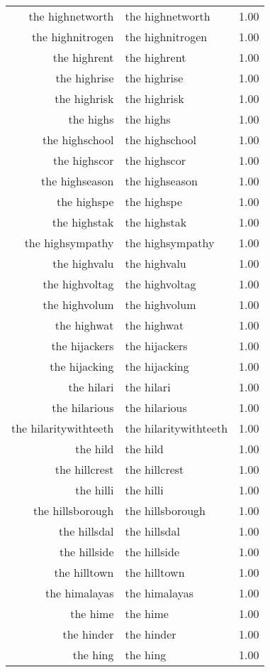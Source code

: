 \begin{table}[ht]
\begin{tabular}{rlr}
  the highnetworth & the highnetworth & 1.00 \\ 
  the highnitrogen & the highnitrogen & 1.00 \\ 
  the highrent & the highrent & 1.00 \\ 
  the highrise & the highrise & 1.00 \\ 
  the highrisk & the highrisk & 1.00 \\ 
  the highs & the highs & 1.00 \\ 
  the highschool & the highschool & 1.00 \\ 
  the highscor & the highscor & 1.00 \\ 
  the highseason & the highseason & 1.00 \\ 
  the highspe & the highspe & 1.00 \\ 
  the highstak & the highstak & 1.00 \\ 
  the highsympathy & the highsympathy & 1.00 \\ 
  the highvalu & the highvalu & 1.00 \\ 
  the highvoltag & the highvoltag & 1.00 \\ 
  the highvolum & the highvolum & 1.00 \\ 
  the highwat & the highwat & 1.00 \\ 
  the hijackers & the hijackers & 1.00 \\ 
  the hijacking & the hijacking & 1.00 \\ 
  the hilari & the hilari & 1.00 \\ 
  the hilarious & the hilarious & 1.00 \\ 
  the hilaritywithteeth & the hilaritywithteeth & 1.00 \\ 
  the hild & the hild & 1.00 \\ 
  the hillcrest & the hillcrest & 1.00 \\ 
  the hilli & the hilli & 1.00 \\ 
  the hillsborough & the hillsborough & 1.00 \\ 
  the hillsdal & the hillsdal & 1.00 \\ 
  the hillside & the hillside & 1.00 \\ 
  the hilltown & the hilltown & 1.00 \\ 
  the himalayas & the himalayas & 1.00 \\ 
  the hime & the hime & 1.00 \\ 
  the hinder & the hinder & 1.00 \\ 
  the hing & the hing & 1.00 \\ 

\end{tabular}
\end{table}
